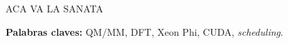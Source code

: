 
\noindent ACA VA LA SANATA

\bigskip

\noindent\textbf{Palabras claves:} QM/MM, DFT, Xeon Phi, CUDA, \textit{scheduling}.
